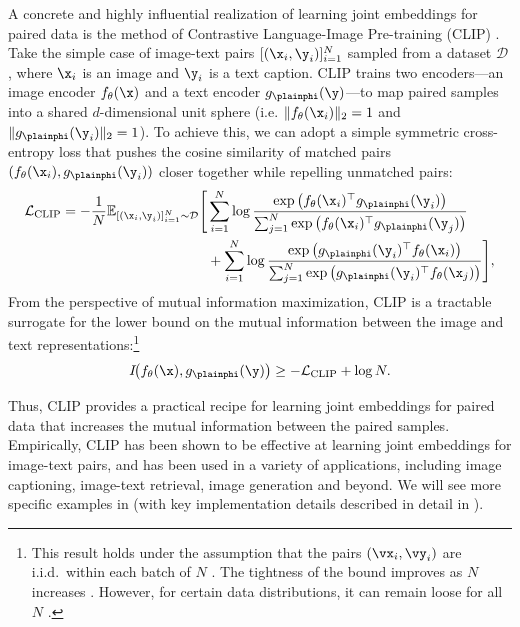 \documentclass[../../book-main.tex]{subfiles}
\begin{document}
A concrete and highly influential realization of learning joint
embeddings for paired data is the method of Contrastive
Language-Image Pre-training (CLIP) \cite{radford2021learning}.
Take the simple case of image-text pairs $[(\x_i, \y_i)]_{i=1}^N$
sampled from a dataset $\mathcal{D}$, where $\x_i$ is an image and
$\y_i$ is a text caption.
CLIP trains two encoders---an image encoder $f_{\theta}(\x)$ and a text
encoder $g_{\plainphi}(\y)$---to map paired samples into a shared
$d$-dimensional unit sphere (i.e. $\|f_{\theta}(\x_i)\|_2 = 1$ and
$\|g_{\plainphi}(\y_i)\|_2 = 1$).
To achieve this, we can adopt a simple symmetric cross-entropy loss
that pushes the cosine similarity of matched pairs
$(f_{\theta}(\x_i),g_{\plainphi}(\y_i))$ closer together while
repelling unmatched pairs:
\begin{align}
    \mathcal{L}_{\mathrm{CLIP}} = -\frac{1}{N}\mathbb{E}_{[(\x_i,
        \y_i)]_{i=1}^N \sim
    \mathcal{D}} \Biggr[  &\sum_{i=1}^N\log \frac{\exp\left(
                f_{\theta}(\x_i)^\top g_{\plainphi}(\y_i)
        \right)}{\sum_{j=1}^N \exp\left( f_{\theta}(\x_i)^\top
        g_{\plainphi}(\y_j) \right)} \nonumber \\
        &+\sum_{i=1}^N\log \frac{\exp\left( g_{\plainphi}(\y_i)^\top
        f_{\theta}(\x_i) \right)}{\sum_{j=1}^N \exp\left(
    g_{\plainphi}(\y_i)^\top f_{\theta}(\x_j) \right)} \Biggr],
    \label{eq:clip-loss}
\end{align}
From the perspective of mutual information maximization, CLIP is a tractable
surrogate for the lower bound on the mutual information between the image and
text representations:\footnote{This result holds under the assumption that the
    pairs $(\vx_i, \vy_i)$ are i.i.d.\ within each batch of $N$
    \cite[Lemma 1]{Oko2025-wk}. The tightness of the bound improves
    as $N$ increases
    \cite{Van_den_Oord2018-qf}.
    However, for certain data distributions, it can remain loose for all $N$
\cite{mcallester2019formal,10.5555/3524938.3525859}.}
\begin{equation}
    I\!\big(f_{\theta}(\x),g_{\plainphi}(\y)\big) \geq -
    \mathcal{L}_{\mathrm{CLIP}} + \log N.
\end{equation}

Thus, CLIP provides a practical recipe for learning joint embeddings for paired
data that increases the mutual information between the paired samples.
Empirically, CLIP has been shown to be effective at learning joint embeddings
for image-text pairs, and has been used in a variety of applications, including
image captioning, image-text retrieval, image generation and beyond. We will see
more specific examples in  (with key implementation
details described in detail in ).
\end{document}
